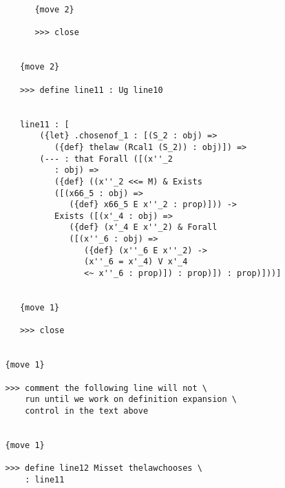 \documentclass{article}
\begin{document}
\begin{verbatim}
         {move 2}

         >>> close


      {move 2}

      >>> define line11 : Ug line10


      line11 : [
          ({let} .chosenof_1 : [(S_2 : obj) => 
             ({def} thelaw (Rcal1 (S_2)) : obj)]) => 
          (--- : that Forall ([(x''_2 
             : obj) => 
             ({def} ((x''_2 <<= M) & Exists 
             ([(x66_5 : obj) => 
                ({def} x66_5 E x''_2 : prop)])) -> 
             Exists ([(x'_4 : obj) => 
                ({def} (x'_4 E x''_2) & Forall 
                ([(x''_6 : obj) => 
                   ({def} (x''_6 E x''_2) -> 
                   (x''_6 = x'_4) V x'_4 
                   <~ x''_6 : prop)]) : prop)]) : prop)]))]


      {move 1}

      >>> close


   {move 1}

   >>> comment the following line will not \
       run until we work on definition expansion \
       control in the text above


   {move 1}

   >>> define line12 Misset thelawchooses \
       : line11



\end{verbatim}
\end{document}
